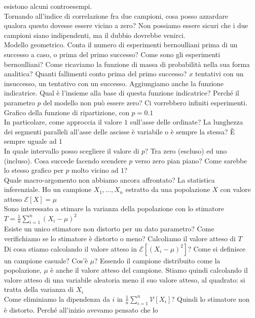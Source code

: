 \documentclass{article}
\begin{document}
    esistono alcuni controesempi. \\
    Tornando all'indice di correlazione fra due campioni, cosa posso azzardare qualora questo dovesse essere vicino a zero? Non possiamo essere sicuri che i due campioni siano
    indipendenti, ma il dubbio dovrebbe venirci. \\
    Modello geometrico. Conta il numero di esperimenti bernoulliani prima di un successo a caso, o prima del primo successo? Come sono gli esperimenti bernoulliani? Come ricaviamo
    la funzione di massa di probabilità nella sua forma analitica? Quanti fallimenti conto prima del primo successo? $ x $ tentativi con un insuccesso, un tentativo con un 
    successo. Aggiungiamo anche la funzione indicatrice. Qual è l'insieme alla base di questa funzione indicatrice? Perché il parametro $ p $ del modello non può essere zero? Ci
    vorrebbero infiniti esperimenti. Grafico della funzione di ripartizione, con $ p = 0.1 $ \\
    In particolare, come approccia il valore $ 1 $ sull'asse delle ordinate? La lunghezza dei segmenti paralleli all'asse delle ascisse è variabile o è sempre la stessa? È sempre
    uguale ad $ 1 $ \\
    In quale intervallo posso scegliere il valore di $ p $? Tra zero (escluso) ed uno (incluso). Cosa succede facendo scendere $ p $ verso zero pian piano? Come sarebbe lo stesso
    grafico per $ p $ molto vicino ad $ 1 $? \\
    Quale macro-argomento non abbiamo ancora affrontato? La statistica inferenziale. Ho un campione $ X_1 , \dots , X_n $ estratto da una popolazione $ X $ con valore atteso
    $ \mathcal E [ X ] = \mu $ \\
    Sono interessato a stimare la varianza della popolazione con lo stimatore $ T = \frac{ 1 }{ n } \sum_{ i = 1 }^n ( X_i - \mu )^2 $ \\
    Esiste un unico stimatore non distorto per un dato parametro? Come verifichiamo se lo stimatore è distorto o meno? Calcoliamo il valore atteso di $ T $ \\
    Di cosa stiamo calcolando il valore atteso in $ \mathcal E [ ( X_i - \mu )^2 ] $? Come si definisce un campione casuale? Cos'è $ \mu $? Essendo il campione distribuito come la
    popolazione, $ \mu $ è anche il valore atteso del campione. Stiamo quindi calcolando il valore atteso di una variabile aleatoria meno il suo valore atteso, al quadrato: si
    tratta della varianza di $ X_i $ \\
    Come eliminiamo la dipendenza da $ i $ in $ \frac{ 1 }{ n } \sum_{ i = 1 }^n \mathcal V [ X_i ] $? Quindi lo stimatore non è distorto. Perché all'inizio avevamo pensato che lo
\end{document}
